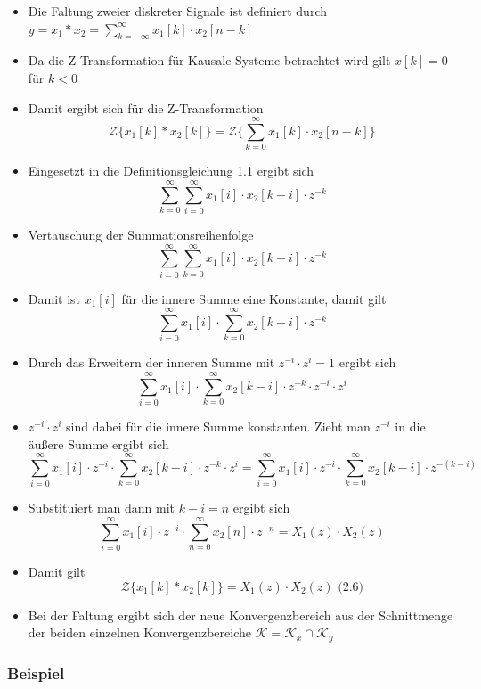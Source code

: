 \documentclass[11pt]{article}
\def\lt{<}
\begin{document}
\begin{itemize}
\item
  Die Faltung zweier diskreter Signale ist definiert durch
  \(y = x_1 * x_2 = \sum_{k=-\infty}^\infty x_1[k] \cdot x_2[n-k]\)
\item
  Da die Z-Transformation für Kausale Systeme betrachtet wird gilt
  \(x[k] = 0\) für \(k \lt 0\)
\item
  Damit ergibt sich für die Z-Transformation
  \[\mathcal{Z} \{x_1[k] * x_2[k]\} = \mathcal{Z} \{\sum_{k=0}^\infty x_1[k] \cdot x_2[n-k]\}\]
\item
  Eingesetzt in die Definitionsgleichung 1.1 ergibt sich
  \[\sum_{k=0}^\infty \sum_{i=0}^\infty x_1[i] \cdot x_2[k-i] \cdot z^{-k}\]
\item
  Vertauschung der Summationsreihenfolge
  \[\sum_{i=0}^\infty \sum_{k=0}^\infty x_1[i] \cdot x_2[k-i] \cdot z^{-k}\]
\item
  Damit ist \(x_1[i]\) für die innere Summe eine Konstante, damit gilt
  \[\sum_{i=0}^\infty x_1[i] \cdot \sum_{k=0}^\infty x_2[k-i] \cdot z^{-k}\]
\item
  Durch das Erweitern der inneren Summe mit \(z^{-i} \cdot z^{i} = 1\)
  ergibt sich
  \[\sum_{i=0}^\infty x_1[i] \cdot \sum_{k=0}^\infty x_2[k-i] \cdot z^{-k} \cdot z^{-i} \cdot z^{i}\]
\item
  \(z^{-i} \cdot z^{i}\) sind dabei für die innere Summe konstanten.
  Zieht man \(z^{-i}\) in die äußere Summe ergibt sich
  \[\sum_{i=0}^\infty x_1[i] \cdot z^{-i} \cdot \sum_{k=0}^\infty x_2[k-i] \cdot z^{-k} \cdot z^{i} = \sum_{i=0}^\infty x_1[i] \cdot z^{-i} \cdot \sum_{k=0}^\infty x_2[k-i] \cdot z^{-(k - i)}\]
\item
  Substituiert man dann mit \(k-i = n\) ergibt sich
  \[\sum_{i=0}^\infty x_1[i] \cdot z^{-i} \cdot \sum_{n=0}^\infty x_2[n] \cdot z^{-n} = X_1(z) \cdot X_2(z)\]
\item
  Damit gilt
  \[\mathcal{Z} \{x_1[k] * x_2[k]\} = X_1(z) \cdot X_2(z)\textrm{  (2.6)}\]
\item
  Bei der Faltung ergibt sich der neue Konvergenzbereich aus der
  Schnittmenge der beiden einzelnen Konvergenzbereiche
  \(\mathcal{K} = \mathcal{K}_x \cap \mathcal{K}_y\)
\end{itemize}

    \subsubsection{Beispiel}\label{beispiel}
\end{document}
